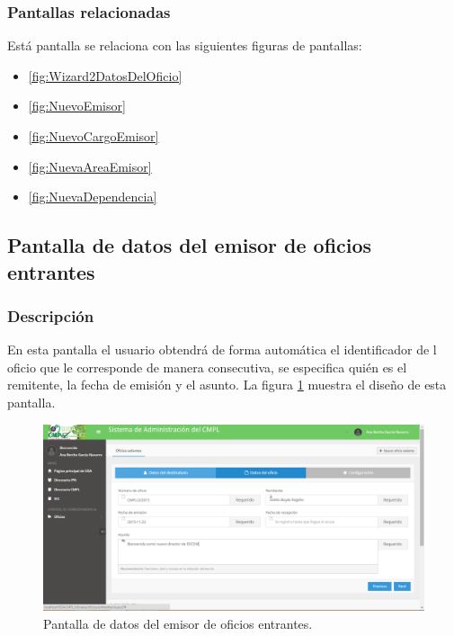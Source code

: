 \subsubsection{Pantallas relacionadas}
Está pantalla se relaciona con las siguientes figuras de pantallas:
	\begin{itemize}
		\item \ref{fig:Wizard2DatosDelOficio}
		\item \ref{fig:NuevoEmisor}
		\item \ref{fig:NuevoCargoEmisor}
		\item \ref{fig:NuevaAreaEmisor}
		\item \ref{fig:NuevaDependencia}
	\end{itemize}
	
\subsection{Pantalla de datos del emisor de oficios entrantes}
\subsubsection{Descripción}
	En esta pantalla el usuario obtendrá de forma automática el identificador de l oficio que le corresponde de manera consecutiva, se especifica quién es el remitente, la fecha de emisión y el asunto. La figura \ref{fig:Wizard2DatosDelOficioSaliente} muestra el diseño de esta pantalla.		
		
	\begin{figure}[htbp!]
		\centering
			\includegraphics[width=1\textwidth]{Pantallas/Wizard2DatosDelOficioSaliente.png}
		\caption{Pantalla de datos del emisor de oficios entrantes.}
		\label{fig:Wizard2DatosDelOficioSaliente}
	\end{figure}

